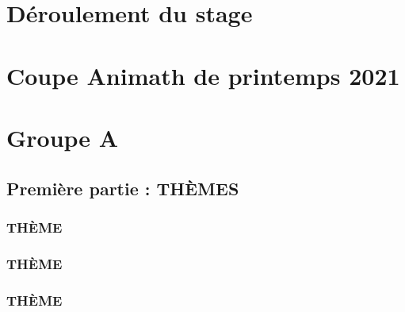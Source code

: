 \documentclass[poly,trombi]{valbonne}
\begin{document}

\pagestyle{plain}

\footnotesize
\pagestyle{trombi}
\newpage


\normalsize


\pagestyle{empty}

\renewcommand{\headrulewidth}{0.4pt}

\tableofcontents

\chapter{Déroulement du stage}
\pagestyle {plain}



\chapter{Coupe Animath de printemps 2021}


\chapter{Groupe A}

\minitoc \clearpage

\section{Première partie : THÈMES}

\subsection{THÈME}


\subsection{THÈME}


\subsection{THÈME}
\end{document}
